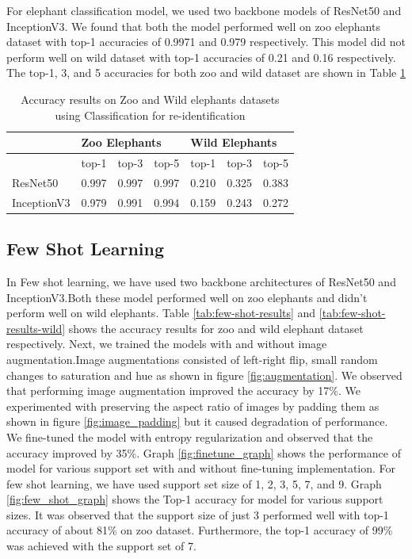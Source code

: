 \documentclass[10pt,twocolumn,letterpaper]{article}
\begin{document}
For elephant classification model, we used two backbone models of ResNet50 and InceptionV3. We found that both the model performed well on zoo elephants dataset with top-1 accuracies of 0.9971 and 0.979 respectively. This model did not perform well on wild dataset with top-1 accuracies of 0.21 and 0.16 respectively. The top-1, 3, and 5 accuracies for both zoo and wild dataset are shown in Table \ref{tab:clf-results}

\begin{table}[]
\begin{tabular}{@{}lllllll@{}}
\toprule
                                 & \multicolumn{3}{l}{Zoo Elephants}          & \multicolumn{3}{l}{Wild Elephants} \\ \midrule
\multicolumn{1}{l|}{}            & top-1 & top-3 & \multicolumn{1}{l|}{top-5} & top-1      & top-3     & top-5     \\
\multicolumn{1}{l|}{ResNet50}    & 0.997 & 0.997 & \multicolumn{1}{l|}{0.997} & 0.210      & 0.325     & 0.383     \\
\multicolumn{1}{l|}{InceptionV3} & 0.979 & 0.991 & \multicolumn{1}{l|}{0.994} & 0.159      & 0.243     & 0.272     \\ \bottomrule
\end{tabular}
\caption{Accuracy results on Zoo and Wild elephants datasets using Classification for re-identification}
\label{tab:clf-results}
\end{table}



\subsection{Few Shot Learning}

In Few shot learning, we have used two backbone architectures of ResNet50 and InceptionV3.Both these model performed well on zoo elephants and didn't perform well on wild elephants. Table \ref{tab:few-shot-results} and \ref{tab:few-shot-results-wild} shows the accuracy results for zoo and wild elephant dataset respectively. Next, we trained the models with and without image augmentation.Image augmentations consisted of left-right flip, small random changes to saturation and hue as shown in figure \ref{fig:augmentation}. We observed that performing image augmentation improved the accuracy by 17\%. We experimented with preserving the aspect ratio of images by padding them as shown in figure \ref{fig:image_padding} but it caused degradation of performance. We fine-tuned the model with entropy regularization and observed that the accuracy improved by 35\%. Graph \ref{fig:finetune_graph} shows the performance of model for various support set with and without fine-tuning implementation. For few shot learning, we have used support set size of 1, 2, 3, 5, 7, and 9. Graph \ref{fig:few_shot_graph} shows the Top-1 accuracy for model for various support sizes. It was observed that the support size of just 3 performed well with top-1 accuracy of about 81\% on zoo dataset. Furthermore, the top-1 accuracy of 99\% was achieved with the support set of 7. 
\end{document}
